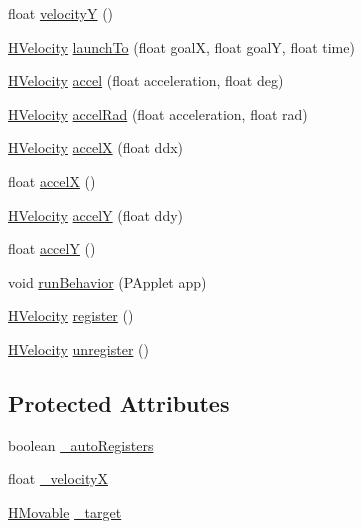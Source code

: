 \begin{DoxyCompactItemize}
float \hyperlink{classhype_1_1behavior_1_1_h_velocity_abe7dc26576adae8adb48ce955702fff0}{velocity\-Y} ()
\item 
\hyperlink{classhype_1_1behavior_1_1_h_velocity}{H\-Velocity} \hyperlink{classhype_1_1behavior_1_1_h_velocity_a3b2f24cb3b9ccdf0aa3c2adf26c8a232}{launch\-To} (float goal\-X, float goal\-Y, float time)
\item 
\hyperlink{classhype_1_1behavior_1_1_h_velocity}{H\-Velocity} \hyperlink{classhype_1_1behavior_1_1_h_velocity_a688277ffa9fc211da32da7f1671f0b43}{accel} (float acceleration, float deg)
\item 
\hyperlink{classhype_1_1behavior_1_1_h_velocity}{H\-Velocity} \hyperlink{classhype_1_1behavior_1_1_h_velocity_a7c3bf557241fa32dc95a88682a1557e9}{accel\-Rad} (float acceleration, float rad)
\item 
\hyperlink{classhype_1_1behavior_1_1_h_velocity}{H\-Velocity} \hyperlink{classhype_1_1behavior_1_1_h_velocity_a76fdbb8a084fd536c8d2f4245a9e9578}{accel\-X} (float ddx)
\item 
float \hyperlink{classhype_1_1behavior_1_1_h_velocity_ab44947a8dd5df4a12ee2cd3295beea59}{accel\-X} ()
\item 
\hyperlink{classhype_1_1behavior_1_1_h_velocity}{H\-Velocity} \hyperlink{classhype_1_1behavior_1_1_h_velocity_ad1dc3d8cf2f5ce87c2a5c5dd5048e399}{accel\-Y} (float ddy)
\item 
float \hyperlink{classhype_1_1behavior_1_1_h_velocity_a71da143ee1531bb9a57a9d155eaa7028}{accel\-Y} ()
\item 
void \hyperlink{classhype_1_1behavior_1_1_h_velocity_acc6d4560989de30788ec2ae4f1ea6913}{run\-Behavior} (P\-Applet app)
\item 
\hyperlink{classhype_1_1behavior_1_1_h_velocity}{H\-Velocity} \hyperlink{classhype_1_1behavior_1_1_h_velocity_acefec10ae890e65be256238ed0e2800f}{register} ()
\item 
\hyperlink{classhype_1_1behavior_1_1_h_velocity}{H\-Velocity} \hyperlink{classhype_1_1behavior_1_1_h_velocity_a5673f18c65637da5063bb7b9b66c7905}{unregister} ()
\end{DoxyCompactItemize}
\subsection*{Protected Attributes}
\begin{DoxyCompactItemize}
\item 
boolean \hyperlink{classhype_1_1behavior_1_1_h_velocity_a406b8d2770d53f58f2acb61c281ac4e2}{\-\_\-auto\-Registers}
\item 
float \hyperlink{classhype_1_1behavior_1_1_h_velocity_a9f3e36117e086a406bd2cdda2493687f}{\-\_\-velocity\-X}
\item 
\hyperlink{interfacehype_1_1interfaces_1_1_h_movable}{H\-Movable} \hyperlink{classhype_1_1behavior_1_1_h_velocity_a9533316db780c8de9b1583549640fd4c}{\-\_\-target}
\end{DoxyCompactItemize}


